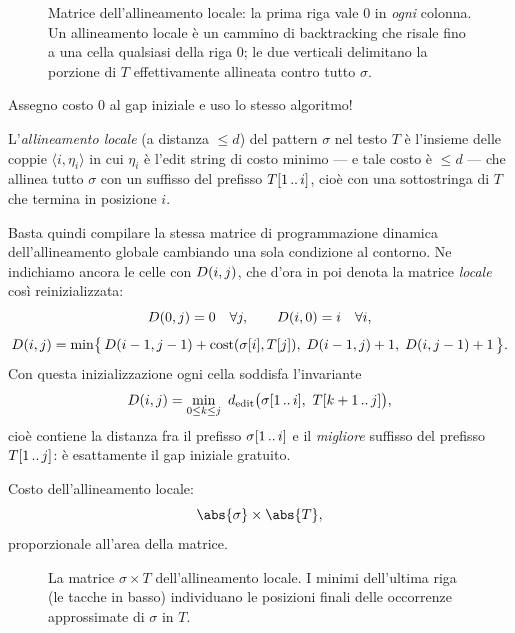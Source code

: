 %
\begin{figure}[H]
  \centering
  
  \caption{Matrice dell'allineamento locale: la prima riga vale $0$ in
  \emph{ogni} colonna. Un allineamento locale è un cammino di backtracking che
  risale fino a una cella qualsiasi della riga $0$; le due verticali delimitano
  la porzione di $T$ effettivamente allineata contro tutto $\sigma$.}
  \label{fig:all-locale-prima-riga}
\end{figure}

Assegno costo $0$ al gap iniziale e uso lo stesso algoritmo!

\begin{definizione}
  \label{def:allineamento-locale}
  L'\emph{allineamento locale} (a distanza $\le d$) del pattern $\sigma$ nel
  testo $T$ è l'insieme delle coppie $\langle i,\eta_i\rangle$ in cui $\eta_i$ è
  l'edit string di costo minimo --- e tale costo è $\le d$ --- che allinea tutto
  $\sigma$ con un suffisso del prefisso $T[1\,..\,i]$, cioè con una sottostringa
  di $T$ che termina in posizione $i$.
\end{definizione}

\begin{osservazione}
  Basta quindi compilare la stessa matrice di programmazione dinamica
  dell'allineamento globale cambiando una sola condizione al contorno. Ne
  indichiamo ancora le celle con $D(i,j)$, che d'ora in poi denota la matrice
  \emph{locale} così reinizializzata:
  \[
    D(0,j)=0 \quad \forall j, \qquad D(i,0)=i \quad \forall i,
  \]
  \[
    D(i,j)=\min\bigl\{\,D(i-1,j-1)+\mathrm{cost}(\sigma[i],T[j]),\;
    D(i-1,j)+1,\; D(i,j-1)+1 \,\bigr\}.
  \]
  Con questa inizializzazione ogni cella soddisfa l'invariante
  \[
    \Dm{i}{j}=\min_{0\le k\le j}\ \dedit\bigl(\pre{\sigma}{i},\ \sub{T}{k+1}{j}\bigr),
  \]
  cioè contiene la distanza fra il prefisso $\sigma[1\,..\,i]$ e il
  \emph{migliore} suffisso del prefisso $T[1\,..\,j]$: è esattamente il gap
  iniziale gratuito.
\end{osservazione}

Costo dell'allineamento locale:
\[
  \abs{\sigma}\times\abs{T},
\]
proporzionale all'area della matrice.

\begin{figure}[H]
  \centering
  
  \caption{La matrice $\sigma\times T$ dell'allineamento locale. I minimi
  dell'ultima riga (le tacche in basso) individuano le posizioni finali delle
  occorrenze approssimate di $\sigma$ in $T$.}
  \label{fig:all-locale-ultima-riga}
\end{figure}

